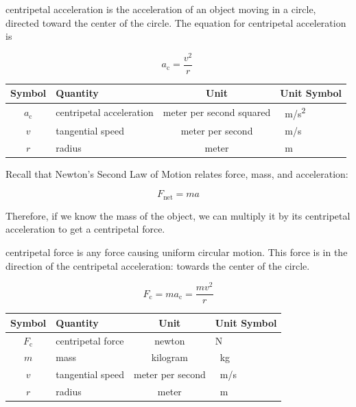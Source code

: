 \documentclass[main.tex]{subfiles}
\begin{document}
\begin{mdframed}[backgroundcolor=black!10]
\Gls{centripetal acceleration} is the acceleration of an object moving in a circle, directed toward the center of the circle. The equation for centripetal acceleration is


\begin{equation} \label{5vsZ8y}
    a_{\text{c}} = \frac{v^2}{r}\ 
\end{equation}

\begin{center}
    \begin{tabular}{cl|cl}
    \hline
    \textbf{Symbol} & \textbf{Quantity} & \textbf{Unit} & \textbf{Unit Symbol}  \\
    \hline\hline
    \rule{0pt}{2.5ex}
        $a_{\text{c}}$ & centripetal acceleration & meter per second squared & \SI{}{m/s^2}\\
        $v$ & tangential speed & meter per second & \SI{}{m/s} \\
        $r$ & radius & meter & \SI{}{m}\\
    \hline
    \end{tabular}
\end{center}
\end{mdframed}

Recall that Newton's Second Law of Motion relates force, mass, and acceleration:

\begin{equation*}
    F_{\text{net}} = ma
\end{equation*}

Therefore, if we know the mass of the object, we can multiply it by its centripetal acceleration to get a centripetal force.

\begin{mdframed}[backgroundcolor=black!10]
\Gls{centripetal force} is any force causing uniform circular motion. This force is in the direction of the centripetal acceleration: towards the center of the circle.

\begin{equation} \label{qzzym8}
    F_{\text{c}} = m a_{\text{c}} = \frac{m v^2}{r}
\end{equation}

\begin{center}
    \begin{tabular}{cl|cl}
    \hline
    \textbf{Symbol} & \textbf{Quantity} & \textbf{Unit} & \textbf{Unit Symbol}  \\
    \hline\hline
    \rule{0pt}{2.5ex}
        $F_{\text{c}}$ & centripetal force & newton & N\\
        $m$ & mass & kilogram & \SI{}{kg}\\
        $v$ & tangential speed & meter per second & \SI{}{m/s} \\
        $r$ & radius & meter & \SI{}{m}\\
    \hline
    \end{tabular}
\end{center}
\end{mdframed}
\end{document}
